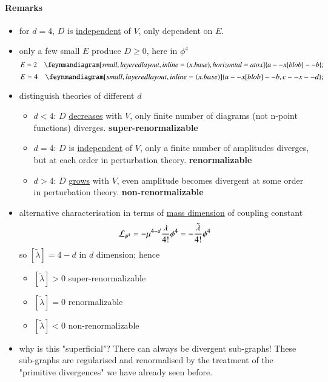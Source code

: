 \paragraph{Remarks}
\begin{itemize}
	\item for $d=4$, $D$ is \underline{independent} of $V$, only dependent on $E$.
	\item only a few small $E$ produce $D \geq 0$, here in $\phi^4$
		$$E = 2 \quad \feynmandiagram[small, layered layout, inline=(x.base),horizontal=a to x]{a -- x[blob] -- b};$$
		$$E = 4 \quad \feynmandiagram[small, layered layout, inline=(x.base)]{a -- x[blob] -- b, c -- x -- d};$$
	\item distinguish theories of different $d$
		\begin{itemize}
			\item $d < 4$: $D$ \underline{decreases} with $V$, only finite number of diagrams (not n-point functions) diverges.
				\textbf{super-renormalizable}
			\item $d=4$: $D$ is \underline{independent} of $V$, only a finite number of amplitudes diverges, but at each order in perturbation theory.
				\textbf{renormalizable}
         \item $d>4$: $D$ \underline{grows} with $V$, even amplitude becomes divergent at some order in perturbation theory.
				\textbf{non-renormalizable}
		\end{itemize}
	\item alternative characterisation in terms of \underline{mass dimension} of coupling constant
		\begin{align*}
			\mathcal{L}_{\phi^4} = -\mu^{4-d}\frac{\lambda}{4!} \phi^4 = - \frac{\tilde{\lambda}}{4!} \phi^4
		\end{align*}
		so $[\tilde{\lambda}] = 4-d$ in $d$ dimension; hence 
			\begin{itemize}
				\item $[\tilde{\lambda}] > 0$ super-renormalizable
				\item $[\tilde{\lambda}] = 0$ renormalizable
				\item $[\tilde{\lambda}] < 0$ non-renormalizable
			\end{itemize}
		\item why is this "superficial"? There can always be divergent sub-graphs! These sub-graphs are regularised and renormalised by the treatment of the "primitive divergences" we have already seen before.
\end{itemize}
